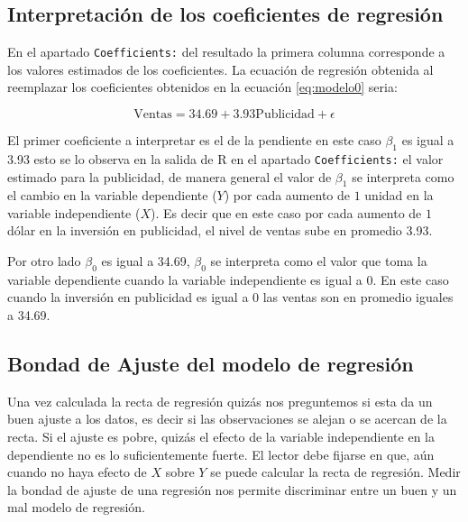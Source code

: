 \documentclass[letterpaper,]{book}
\begin{document}
\hypertarget{coefregre}{%
\subsection{Interpretación de los coeficientes de regresión}\label{coefregre}}

En el apartado \texttt{Coefficients:} del resultado la primera columna corresponde a los valores estimados de los coeficientes. La ecuación de regresión obtenida al reemplazar los coeficientes obtenidos en la ecuación \eqref{eq:modelo0} seria:

\begin{equation}
\text{Ventas} = 34.69 + 3.93\text{Publicidad} + \epsilon 
    \label{eq:modelo}
\end{equation}

El primer coeficiente a interpretar es el de la pendiente en este caso \(\beta_1\) es igual a 3.93 esto se lo observa en la salida de R en el apartado \texttt{Coefficients:} el valor estimado para la publicidad, de manera general el valor de \(\beta_1\) se interpreta como el cambio en la variable dependiente (\(Y\)) por cada aumento de \(1\) unidad en la variable independiente (\(X\)). Es decir que en este caso por cada aumento de \(1\) dólar en la inversión en publicidad, el nivel de ventas sube en promedio 3.93.

Por otro lado \(\beta_0\) es igual a 34.69, \(\beta_0\) se interpreta como el valor que toma la variable dependiente cuando la variable independiente es igual a \(0\). En este caso cuando la inversión en publicidad es igual a \(0\) las ventas son en promedio iguales a 34.69.

\hypertarget{bondad-de-ajuste-del-modelo-de-regresion}{%
\subsection{Bondad de Ajuste del modelo de regresión}\label{bondad-de-ajuste-del-modelo-de-regresion}}

Una vez calculada la recta de regresión quizás nos preguntemos si esta da un buen ajuste a los datos, es decir si las observaciones se alejan o se acercan de la recta. Si el ajuste es pobre, quizás el efecto de la variable independiente en la dependiente no es lo suficientemente fuerte. El lector debe fijarse en que, aún cuando no haya efecto de \(X\) sobre \(Y\) se puede calcular la recta de regresión. Medir la bondad de ajuste de una regresión nos permite discriminar entre un buen y un mal modelo de regresión.
\end{document}
